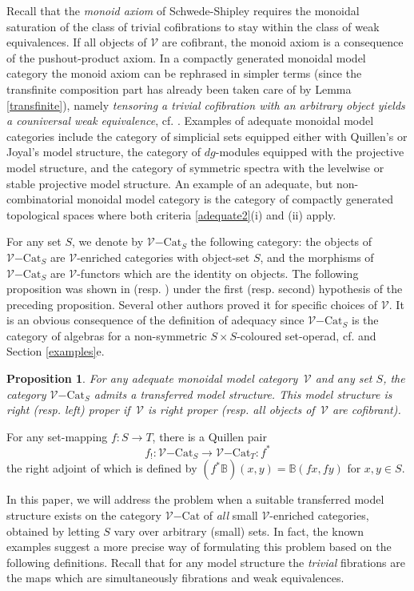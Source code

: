 \documentclass[10pt]{amsart}
\theoremstyle{plain}
\newtheorem{prp}[subsection]{Proposition}
\theoremstyle{remark}
\def\Vv{\mathcal{V}}
\def\Cat{\mathrm{Cat}}
\def\VCat{\Vv\mathrm{-}\Cat}
\def\BB{\mathbb{B}}
\def\lrto{\longrightarrow}
\begin{document}
\noindent Recall that the \emph{monoid axiom} of Schwede-Shipley \cite{SS} requires the monoidal saturation of the class of trivial cofibrations to stay within the class of weak equivalences. If all objects of $\Vv$ are cofibrant, the monoid axiom is a consequence of the pushout-product axiom. In a compactly generated monoidal model category the monoid axiom can be rephrased in simpler terms (since the transfinite composition part has already been taken care of by Lemma \ref{transfinite}), namely \emph{tensoring a trivial cofibration with an arbitrary object yields a couniversal weak equivalence}, cf. \cite{BB}. Examples of adequate monoidal model categories include the category of simplicial sets equipped either with Quillen's or Joyal's model structure, the category of $dg$-modules equipped with the projective model structure, and the category of symmetric spectra with the levelwise or stable projective model structure. An example of an adequate, but non-combinatorial monoidal model category is the category of compactly generated topological spaces where both criteria \ref{adequate2}(i) and (ii) apply.\vspace{1ex}

For any set $S$, we denote by $\VCat_S$ the following category: the objects of $\VCat_S$ are $\Vv$-enriched categories with object-set $S$, and the morphisms of $\VCat_S$ are $\Vv$-functors which are the identity on objects. The following proposition was shown in \cite{BM2} (resp. \cite{SS2,Mu}) under the first (resp. second) hypothesis of the preceding proposition. Several other authors proved it for specific choices of $\Vv$. It is an obvious consequence of the definition of adequacy since $\VCat_S$ is the category of algebras for a non-symmetric $S\times S$-coloured set-operad, cf. \cite{BM2} and Section \ref{examples}e.

\begin{prp}\label{VCatS}For any adequate monoidal model category $\,\Vv$ and any set $S$, the category $\VCat_S$ admits a transferred model structure. This model structure is right (resp. left) proper if $\,\Vv$ is right proper (resp. all objects of $\,\Vv$ are cofibrant).\end{prp}

For any set-mapping $f:S\to T$, there is a Quillen pair$$f_!:\VCat_S\lrto\VCat_T:f^*$$the right adjoint of which is defined by $(f^*\BB)(x,y)=\BB(fx,fy)$ for $x,y\in S$.\vspace{1ex}

In this paper, we will address the problem when a suitable transferred model structure exists on the category $\VCat$ of \emph{all} small $\Vv$-enriched categories, obtained by letting $S$ vary over arbitrary (small) sets. In fact, the known examples suggest a more precise way of formulating this problem based on the following definitions. Recall that for any model structure the \emph{trivial} fibrations are the maps which are simultaneously fibrations and weak equivalences.
\end{document}
